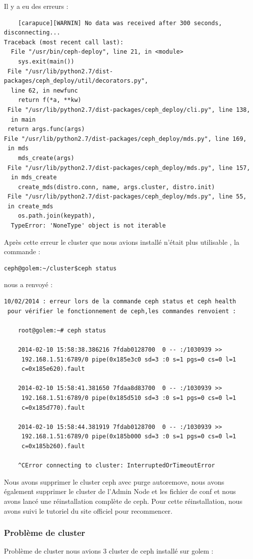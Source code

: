 \documentclass[12pt]{article}
\begin{document}
	Il y a eu des erreurs :
	\begin{verbatim}
	[carapuce][WARNIN] No data was received after 300 seconds, disconnecting...
Traceback (most recent call last):
  File "/usr/bin/ceph-deploy", line 21, in <module>
    sys.exit(main())
 File "/usr/lib/python2.7/dist-packages/ceph_deploy/util/decorators.py",
  line 62, in newfunc
    return f(*a, **kw)
 File "/usr/lib/python2.7/dist-packages/ceph_deploy/cli.py", line 138,
  in main
 return args.func(args)
File "/usr/lib/python2.7/dist-packages/ceph_deploy/mds.py", line 169,
 in mds
    mds_create(args)
 File "/usr/lib/python2.7/dist-packages/ceph_deploy/mds.py", line 157,
  in mds_create
    create_mds(distro.conn, name, args.cluster, distro.init)
 File "/usr/lib/python2.7/dist-packages/ceph_deploy/mds.py", line 55, 
 in create_mds
    os.path.join(keypath),
  TypeError: 'NoneType' object is not iterable 
	\end{verbatim}

Après cette erreur le cluster que nous avions installé n’était plus utilisable , la commande :
\begin{verbatim}
ceph@golem:~/cluster$ceph status
\end{verbatim}
nous a renvoyé :
\begin{verbatim}
10/02/2014 : erreur lors de la commande ceph status et ceph health
 pour vérifier le fonctionnement de ceph,les commandes renvoient :

    root@golem:~# ceph status

    2014-02-10 15:58:38.386216 7fdab0128700  0 -- :/1030939 >>
     192.168.1.51:6789/0 pipe(0x185e3c0 sd=3 :0 s=1 pgs=0 cs=0 l=1 
     c=0x185e620).fault

    2014-02-10 15:58:41.381650 7fdaa8d83700  0 -- :/1030939 >>
     192.168.1.51:6789/0 pipe(0x185d510 sd=3 :0 s=1 pgs=0 cs=0 l=1 
     c=0x185d770).fault

    2014-02-10 15:58:44.381919 7fdab0128700  0 -- :/1030939 >>
     192.168.1.51:6789/0 pipe(0x185b000 sd=3 :0 s=1 pgs=0 cs=0 l=1 
     c=0x185b260).fault

    ^CError connecting to cluster: InterruptedOrTimeoutError
\end{verbatim}

Nous avons supprimer le cluster ceph avec purge autoremove, nous avons également supprimer le cluster de l'Admin Node et les fichier de conf et nous avons lancé une réinstallation complète de ceph. Pour cette réinstallation, nous avons suivi le tutoriel du site officiel pour recommencer.
	\subsubsection{Problème de cluster}
	Problème de cluster nous avions 3 cluster de ceph installé sur golem :
	
\end{document}
